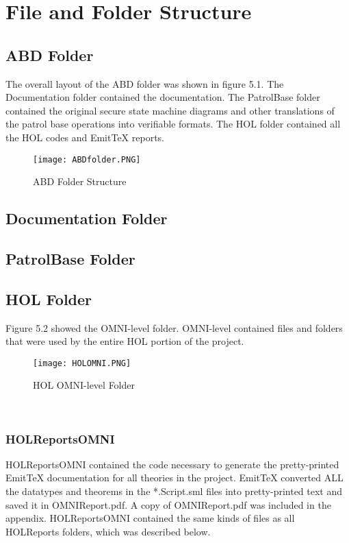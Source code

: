 
\chapter{File and Folder Structure}
\label{cha:file-fold-struct}

\section*{ABD Folder}
\label{sec:abd-folder}
The overall layout of the ABD folder was shown in figure 5.1.  The Documentation folder contained
the documentation.  The PatrolBase folder contained the original secure state machine diagrams
and other translations of the patrol base operations into verifiable formats.  The HOL folder
contained all the HOL codes and EmitTeX reports. 
  \begin{figure}[h]
  \centering
  \texttt{[image: ABDfolder.PNG]}
  \caption{ABD Folder Structure}
\end{figure}

\section*{Documentation Folder}
\label{sec:documentation-folder}

\section*{PatrolBase Folder}
\label{sec:patrolbase-folder}

\section*{HOL Folder}
\label{sec:hol-folder}

Figure 5.2 showed the OMNI-level folder.  OMNI-level contained files and folders that were
used by the entire HOL portion of the project. 
\begin{figure}[h]
  \centering
  \texttt{[image: HOLOMNI.PNG]}
  \caption{HOL OMNI-level Folder}
\end{figure}\\

\subsection*{HOLReportsOMNI}
\label{sec:holreportsomni}

HOLReportsOMNI contained the code necessary to generate the pretty-printed EmitTeX
documentation for all theories in the project.  EmitTeX converted ALL the datatypes
and theorems in the *.Script.sml files into pretty-printed text and saved it in
OMNIReport.pdf.  A copy of OMNIReport.pdf was included in the appendix.  HOLReportsOMNI
contained the same kinds of files as all HOLReports folders, which was described below.  

